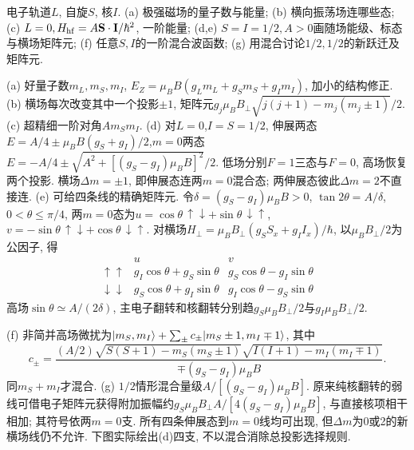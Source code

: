 \begin{exercise}电子轨道$L$, 自旋$S$, 核$I$. (a) 极强磁场的量子数与能量; (b) 横向振荡场连哪些态; (c) $L=0,H_{\rm hf}=A\mathbf S\cdot\mathbf I/\hbar^2$, 一阶能量; (d,e) $S=I=1/2,A>0$画随场能级、标态与横场矩阵元; (f) 任意$S,I$的一阶混合波函数; (g) 用混合讨论$1/2,1/2$的新跃迁及矩阵元.\end{exercise}
\begin{solution}(a) 好量子数$m_L,m_S,m_I$, $E_Z=\mu_BB(g_Lm_L+g_Sm_S+g_Im_I)$, 加小的结构修正. (b) 横场每次改变其中一个投影$\pm1$, 矩阵元$g_j\mu_BB_\perp\sqrt{j(j+1)-m_j(m_j\pm1)}/2$. (c) 超精细一阶对角$Am_Sm_I$. (d) 对$L=0$,$I=S=1/2$, 伸展两态$E=A/4\pm\mu_BB(g_S+g_I)/2$,$m=0$两态$E=-A/4\pm\sqrt{A^2+[(g_S-g_I)\mu_BB]^2}/2$. 低场分别$F=1$三态与$F=0$, 高场恢复两个投影. 横场$\Delta m=\pm1$, 即伸展态连两$m=0$混合态; 两伸展态彼此$\Delta m=2$不直接连. (e) 可给四条线的精确矩阵元. 令$\delta=(g_S-g_I)\mu_BB>0$, $\tan2\theta=A/\delta$, $0<\theta\le\pi/4$, 两$m=0$态为$u=\cos\theta\,\uparrow\downarrow+\sin\theta\,\downarrow\uparrow$, $v=-\sin\theta\,\uparrow\downarrow+\cos\theta\,\downarrow\uparrow$. 对横场$H_\perp=\mu_BB_\perp(g_SS_x+g_II_x)/\hbar$, 以$\mu_BB_\perp/2$为公因子, 得
\[\begin{array}{c|cc}
 &u&v\\\hline
 \uparrow\uparrow&g_I\cos\theta+g_S\sin\theta&g_S\cos\theta-g_I\sin\theta\\
 \downarrow\downarrow&g_S\cos\theta+g_I\sin\theta&g_I\cos\theta-g_S\sin\theta
\end{array}\]
高场$\sin\theta\simeq A/(2\delta)$, 主电子翻转和核翻转分别趋$g_S\mu_BB_\perp/2$与$g_I\mu_BB_\perp/2$.

(f) 非简并高场微扰为$\lvert m_S,m_I\rangle+\sum_{\pm}c_\pm\lvert m_S\pm1,m_I\mp1\rangle$, 其中
\[c_\pm=\frac{(A/2)\sqrt{S(S+1)-m_S(m_S\pm1)}\sqrt{I(I+1)-m_I(m_I\mp1)}}{\mp(g_S-g_I)\mu_BB}.\]
同$m_S+m_I$才混合. (g) $1/2$情形混合量级$A/[(g_S-g_I)\mu_BB]$. 原来纯核翻转的弱线可借电子矩阵元获得附加振幅约$g_S\mu_BB_\perp A/[4(g_S-g_I)\mu_BB]$, 与直接核项相干相加; 其符号依两$m=0$支. 所有四条伸展态到$m=0$线均可出现, 但$\Delta m$为0或2的新横场线仍不允许. 下图实际绘出(d)四支, 不以混合消除总投影选择规则.
\end{solution}

